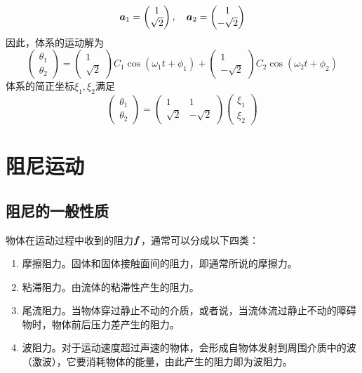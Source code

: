 \begin{example}[双摆]
\begin{equation*}
	\boldsymbol{a}_1 = \begin{pmatrix} 1 \\ \sqrt{2} \end{pmatrix},\quad \boldsymbol{a}_2 = \begin{pmatrix} 1 \\ -\sqrt{2} \end{pmatrix}
\end{equation*}
因此，体系的运动解为
\begin{equation*}
	\begin{pmatrix} \theta_1 \\ \theta_2 \end{pmatrix} = \begin{pmatrix} 1 \\ \sqrt{2} \end{pmatrix} C_1 \cos (\omega_1 t+\phi_1) + \begin{pmatrix} 1 \\ -\sqrt{2} \end{pmatrix} C_2 \cos (\omega_2 t+\phi_2)
\end{equation*}
体系的简正坐标$\xi_1,\xi_2$满足
\begin{equation*}
	\begin{pmatrix} \theta_1 \\ \theta_2 \end{pmatrix} = \begin{pmatrix} 1 & 1 \\ \sqrt{2} & -\sqrt{2} \end{pmatrix} \begin{pmatrix} \xi_1 \\ \xi_2 \end{pmatrix}
\end{equation*}
\end{example}

\section{阻尼运动}

\subsection{阻尼的一般性质}

物体在运动过程中收到的阻力$\boldsymbol{f}$，通常可以分成以下四类：
\begin{enumerate}
	\item {\heiti 摩擦阻力}。固体和固体接触面间的阻力，即通常所说的摩擦力。
	\item {\heiti 粘滞阻力}。由流体的粘滞性产生的阻力。
	\item {\heiti 尾流阻力}。当物体穿过静止不动的介质，或者说，当流体流过静止不动的障碍物时，物体前后压力差产生的阻力。
	\item {\heiti 波阻力}。对于运动速度超过声速的物体，会形成自物体发射到周围介质中的波（激波），它要消耗物体的能量，由此产生的阻力即为波阻力。
\end{enumerate}


